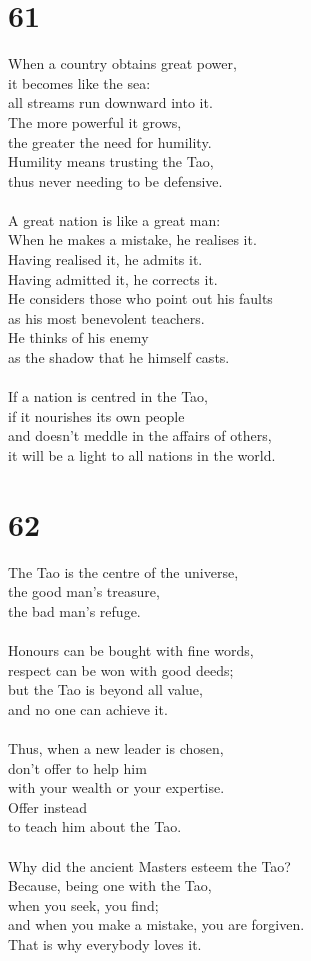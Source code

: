 \documentclass[b5paper, 12pt, oneside]{book}
\begin{document}
\chapter*{61}
When a country obtains great power,\\
it becomes like the sea:\\
all streams run downward into it.\\
The more powerful it grows,\\
the greater the need for humility.\\
Humility means trusting the Tao,\\
thus never needing to be defensive.\\
\\
A great nation is like a great man:\\
When he makes a mistake, he realises it.\\
Having realised it, he admits it.\\
Having admitted it, he corrects it.\\
He considers those who point out his faults\\
as his most benevolent teachers.\\
He thinks of his enemy\\
as the shadow that he himself casts.\\
\\
If a nation is centred in the Tao,\\
if it nourishes its own people\\
and doesn't meddle in the affairs of others,\\
it will be a light to all nations in the world.

\chapter*{62}
The Tao is the centre of the universe,\\
the good man's treasure,\\
the bad man's refuge.\\
\\
Honours can be bought with fine words,\\
respect can be won with good deeds;\\
but the Tao is beyond all value,\\
and no one can achieve it.\\
\\
Thus, when a new leader is chosen,\\
don't offer to help him\\
with your wealth or your expertise.\\
Offer instead\\
to teach him about the Tao.\\
\\
Why did the ancient Masters esteem the Tao?\\
Because, being one with the Tao,\\
when you seek, you find;\\
and when you make a mistake, you are forgiven.\\
That is why everybody loves it.
\end{document}

